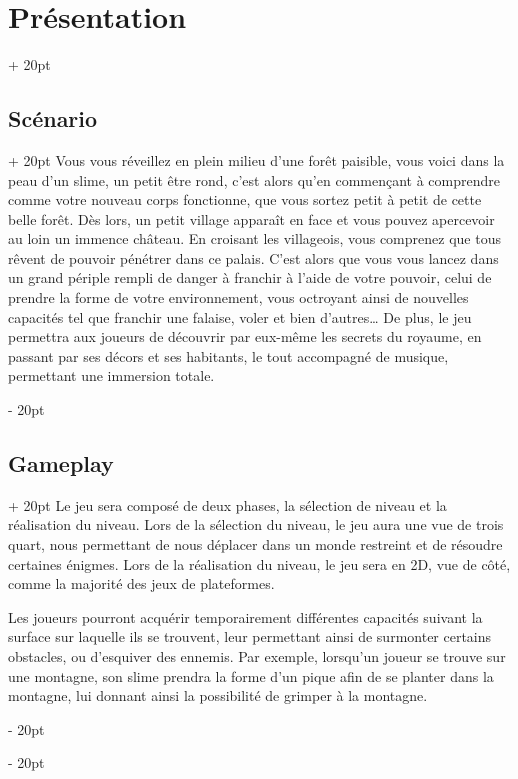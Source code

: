 \documentclass[a4paper, 12pt, twoside]{article}
\newcommand{\ind}[1][20pt]{\advance\leftskip + #1}
\newcommand{\deind}[1][20pt]{\advance\leftskip - #1}
\newenvironment{indt}[2][20pt]{#2 \par \ind[#1]}{\par \deind} %
\begin{document}

    \newpage

    \begin{indt}{\section{Présentation}}
        \begin{indt}{\subsection{Scénario}}
            Vous vous réveillez en plein milieu d'une forêt paisible, vous voici dans la peau d'un slime, un petit être rond, c'est alors qu'en commençant à comprendre comme votre nouveau corps fonctionne, que vous sortez petit à petit de cette belle forêt. Dès lors, un petit village apparaît en face et vous pouvez apercevoir au loin un immence château. En croisant les villageois, vous comprenez que tous rêvent de pouvoir pénétrer dans ce palais. C'est alors que vous vous lancez dans un grand périple rempli de danger à franchir à l'aide de votre pouvoir, celui de prendre la forme de votre environnement, vous octroyant ainsi de nouvelles capacités tel que franchir une falaise, voler et bien d'autres… De plus, le jeu permettra aux joueurs de découvrir par eux-même les secrets du royaume, en passant par ses décors et ses habitants, le tout accompagné de musique, permettant une immersion totale.
        \end{indt}
        
        \begin{indt}{\subsection{Gameplay}}
            Le jeu sera composé de deux phases, la sélection de niveau et la réalisation du niveau. Lors de la sélection du niveau, le jeu aura une vue de trois quart, nous permettant de nous déplacer dans un monde restreint et de résoudre certaines énigmes. Lors de la réalisation du niveau, le jeu sera en 2D, vue de côté, comme la majorité des jeux de plateformes.

            Les joueurs pourront acquérir temporairement différentes capacités suivant la surface sur laquelle ils se trouvent, leur permettant ainsi de surmonter certains obstacles, ou d'esquiver des ennemis. Par exemple, lorsqu'un joueur se trouve sur une montagne, son slime prendra la forme d'un pique afin de se planter dans la montagne, lui donnant ainsi la possibilité de grimper à la montagne. 


\end{indt}
\end{indt}
\end{document}
